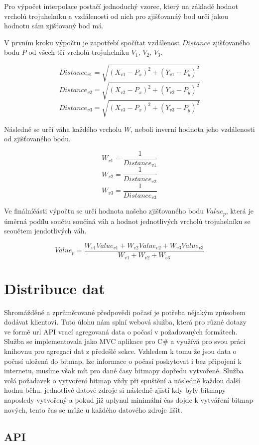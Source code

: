 \documentclass[czech,bachelor,dept460,male,csharp,cpdeclaration]{diploma}
\begin{document}
	Pro výpočet interpolace postačí jednoduchý vzorec, který na základě hodnot vrcholů trojuhelníku a vzdálenosti od nich pro zjišťovanáý bod určí jakou hodnotu sám zjišťovaný bod má.
	
	
	V prvním kroku výpočtu je zapotřebí spočítat vzdálenost $Distance$ zjišťovaného bodu $P$ od všech tří vrcholů trojuhelníku $V_1$, $V_2$, $V_3$. 
	
	\[Distance_{v1} =\sqrt{(X_{v1}-P_x)^2+(Y_{v1}-P_y)^2}\]
	\[Distance_{v2} =\sqrt{(X_{v2}-P_x)^2+(Y_{v2}-P_y)^2}\]
	\[Distance_{v3} =\sqrt{(X_{v3}-P_x)^2+(Y_{v3}-P_y)^2}\]
	
	Následně se určí váha každého vrcholu $W$, neboli inverní hodnota jeho vzdálenosti od zjišťovaného bodu.
	
	\[W_{v1} =\frac{1}{Distance_{v1}}\]
	\[W_{v2} =\frac{1}{Distance_{v2}}\]
	\[W_{v3} =\frac{1}{Distance_{v3}}\]
	
	Ve finálníčásti výpočtu se určí hodnota našeho zjišťovaného bodu $Value_p$, která je úměrná podílu součtu součíná váh a hodnot jednotlivých vrcholů trojuhelníku se seoučtem jendotlivých váh.
	
	\[Value_p = \frac{W_{v1}Value_{v1} + W_{v2}Value_{v2} + W_{v3}Value_{v3}}{W_{v1} + W_{v2} + W_{v3}} \]
	
	
	\section{Distribuce dat}
	
	Shromážděné a zprůměrované předpovědi počasí je potřeba nějakým způsobem dodávat klientovi. Tuto úlohu nám splní webová služba, která pro různé dotazy ve formě url API vrací agregovaná data o počasí v požadovaných formátech. Služba se implementovala jako MVC aplikace pro C\# a využívá pro svou práci knihovnu pro agregaci dat z předešlé sekce. Vzhledem k tomu že jsou data o počasí uložená do bitmap, lze informace o počasí poskytovat i bez připojení k internetu, musíme však mít pro dané časy bitmapy dopředu vytvořené. Služba volá požadavek o vytvoření bitmap vždy při spuštění a následně každou další hodnu běhu, jednotlivé datové zdroje si následně zjistí kdy byly bitmapy naposledy vytvořený a pokud již uplynul minimální čas dojde k vytváření bitmap nových, tento čas se může u každého datového zdroje lišit.
	
	\subsection{API}
	
\end{document}

